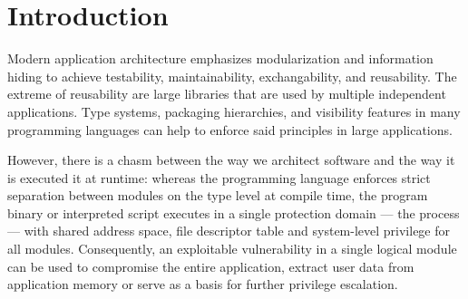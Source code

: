 \documentclass[10pt,twocolumn,a4paper]{article}
\begin{document}
\section{Introduction}\label{intro}

%
%

Modern application architecture emphasizes modularization and information hiding to achieve testability, maintainability, exchangability, and reusability.
The extreme of reusability are large libraries that are used by multiple independent applications.
Type systems, packaging hierarchies, and visibility features in many programming languages can help to enforce said principles in large applications.

However, there is a chasm between the way we architect software and the way it is executed it at runtime:
whereas the programming language enforces strict separation between modules on the type level at compile time,
the program binary or interpreted script executes in a single protection domain --- the process ---
with shared address space, file descriptor table and system-level privilege for all modules.
Consequently, an exploitable vulnerability in a single logical module can be used to compromise the entire application, extract user data from application memory or serve as a basis for further privilege escalation.
\end{document}
